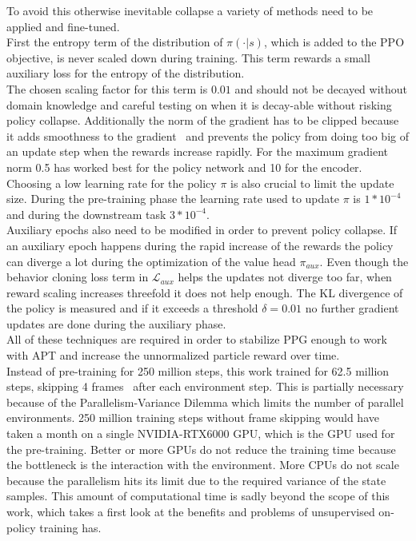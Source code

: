 \documentclass{article}
\begin{document}
\noindent To avoid this otherwise inevitable collapse a variety of methods need to be applied and fine-tuned.\\
First the entropy term of the distribution of $\pi(\cdot|s)$, which is added to the PPO objective,
is never scaled down during training. This term rewards a small auxiliary loss 
for the entropy of the distribution.\\
The chosen scaling factor for this term is $0.01$ and should not be decayed without domain knowledge and careful
testing on when it is decay-able without risking policy collapse. Additionally the norm of the
gradient has to be clipped because it adds smoothness to the gradient~\cite{Zhang2020Why} and prevents
the policy from doing too big of an update step when the rewards increase rapidly.
For the maximum gradient norm
0.5 has worked best for the policy network and 10 for the encoder.\\
Choosing a low learning rate for the policy $\pi$ is also crucial to limit the update size.
During the pre-training phase the learning rate used to update $\pi$ is $1 * 10^{-4}$ and during the downstream task $3*10^{-4}$.\\
Auxiliary epochs also need to be modified in order to prevent policy collapse. If an auxiliary epoch happens
during the rapid increase of the rewards the policy can diverge a lot during the optimization of the value head $\pi_{aux}$.
Even though the behavior cloning loss term in $\mathcal{L}_{aux}$ helps the updates not diverge too far,
when reward scaling increases threefold it does not help enough. The KL divergence of the policy is measured
and if it exceeds a threshold $\delta = 0.01$ no further gradient updates are done during the auxiliary phase.\\
All of these techniques are required in order to stabilize PPG enough to work with APT and increase the unnormalized particle
reward over time.\\
Instead of pre-training for 250 million steps, this work trained for 62.5 million steps, skipping 4 frames~\cite{DBLP:journals/corr/abs-2102-03718} after each environment step.
This is partially necessary because of the Parallelism-Variance Dilemma which limits the number of parallel environments. 250
million training steps without frame skipping would have taken a month on a single NVIDIA-RTX6000 GPU,
which is the GPU used for the pre-training. Better or more GPUs do not
reduce the training time because the bottleneck is the interaction with the environment.
More CPUs do not scale because the parallelism hits its limit due to the required variance of
the state samples. This amount of computational time is sadly beyond the scope of this work, which takes a first 
look at the benefits and problems of unsupervised on-policy training has.
\end{document}
